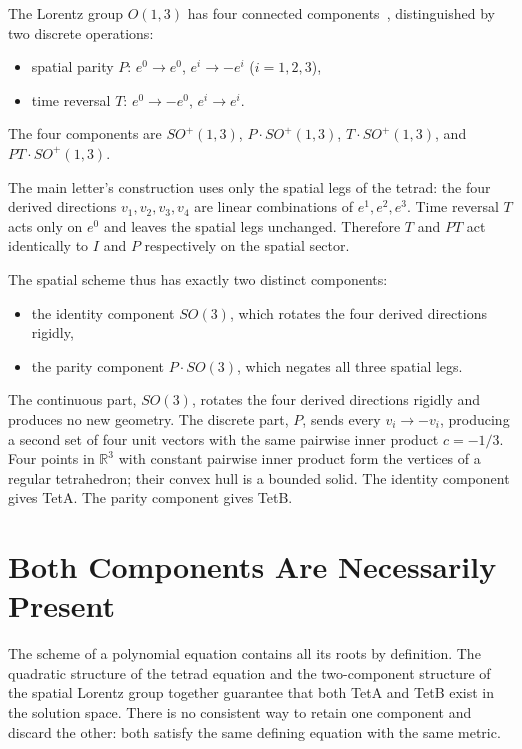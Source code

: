 \documentclass[twocolumn]{iopjournal}
\begin{document}
The Lorentz group $O(1,3)$ has four connected components~\cite{Wald1984}, distinguished by two discrete operations:
\begin{itemize}
\item spatial parity $P$: $e^0 \to e^0$, $e^i \to -e^i$ ($i = 1,2,3$),
\item time reversal $T$: $e^0 \to -e^0$, $e^i \to e^i$.
\end{itemize}
The four components are $SO^+(1,3)$, $P \cdot SO^+(1,3)$, $T \cdot SO^+(1,3)$, and $PT \cdot SO^+(1,3)$.

The main letter's construction uses only the spatial legs of the tetrad: the four derived directions $v_1, v_2, v_3, v_4$ are linear combinations of $e^1, e^2, e^3$. Time reversal $T$ acts only on $e^0$ and leaves the spatial legs unchanged. Therefore $T$ and $PT$ act identically to $I$ and $P$ respectively on the spatial sector.

The spatial scheme thus has exactly two distinct components:
\begin{itemize}
\item the identity component $SO(3)$, which rotates the four derived directions rigidly,
\item the parity component $P \cdot SO(3)$, which negates all three spatial legs.
\end{itemize}

The continuous part, $SO(3)$, rotates the four derived directions rigidly and produces no new geometry. The discrete part, $P$, sends every $v_i \to -v_i$, producing a second set of four unit vectors with the same pairwise inner product $c = -1/3$. Four points in $\mathbb{R}^3$ with constant pairwise inner product form the vertices of a regular tetrahedron; their convex hull is a bounded solid. The identity component gives TetA. The parity component gives TetB.


\section*{Both Components Are Necessarily Present}

The scheme of a polynomial equation contains all its roots by definition. The quadratic structure of the tetrad equation and the two-component structure of the spatial Lorentz group together guarantee that both TetA and TetB exist in the solution space. There is no consistent way to retain one component and discard the other: both satisfy the same defining equation with the same metric.
\end{document}
